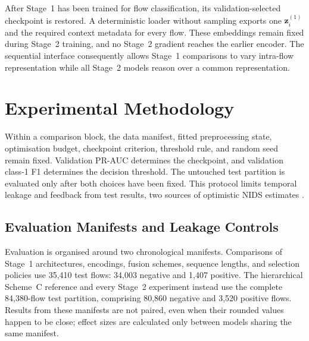 \documentclass[11pt,fleqn]{report}
\begin{document}
After Stage~1 has been trained for flow classification, its validation-selected checkpoint is restored. A deterministic loader without sampling exports one $\mathbf{z}^{(1)}_i$ and the required context metadata for every flow. These embeddings remain fixed during Stage~2 training, and no Stage~2 gradient reaches the earlier encoder. The sequential interface consequently allows Stage~1 comparisons to vary intra-flow representation while all Stage~2 models reason over a common representation.

\providecommand{\ExpPlatform}{Google Colaboratory Pro+}
\providecommand{\ExpComputeBudget}{600 purchased compute units}
\providecommand{\ExpGPU}{NVIDIA L4 (24~GB)}
\providecommand{\ExpCPU}{Google Colab hosted CPU; exact model not retained in the run metadata}
\providecommand{\ExpOS}{Google Colab hosted Linux runtime}
\providecommand{\ExpSoftware}{PyTorch and scikit-learn on CUDA; exact version snapshot not retained}
\providecommand{\ExpSuricata}{Suricata with the custom output module; exact version and revision not retained}

\chapter{Experimental Methodology}
\label{sec:experimental_methodology}

Within a comparison block, the data manifest, fitted preprocessing state, optimisation budget, checkpoint criterion, threshold rule, and random seed remain fixed. Validation PR-AUC determines the checkpoint, and validation class-1 F1 determines the decision threshold. The untouched test partition is evaluated only after both choices have been fixed. This protocol limits temporal leakage and feedback from test results, two sources of optimistic NIDS estimates \cite{SommerPaxson2010,Arp2022DosDonts}.

\section{Evaluation Manifests and Leakage Controls}
\label{subsec:experimental_data_protocol}

Evaluation is organised around two chronological manifests. Comparisons of Stage~1 architectures, encodings, fusion schemes, sequence lengths, and selection policies use 35,410 test flows: 34,003 negative and 1,407 positive. The hierarchical Scheme~C reference and every Stage~2 experiment instead use the complete 84,380-flow test partition, comprising 80,860 negative and 3,520 positive flows. Results from these manifests are not paired, even when their rounded values happen to be close; effect sizes are calculated only between models sharing the same manifest.
\end{document}
